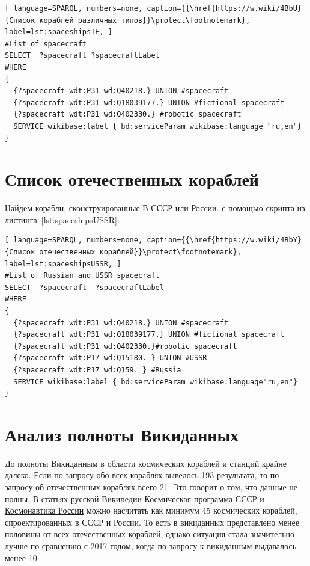 \begin{lstlisting}[ language=SPARQL, numbers=none, caption={{\href{https://w.wiki/4BbU}{Список кораблей различных типов}}\protect\footnotemark}, label=lst:spaceshipsIE, ]
#List of spacecraft 
SELECT  ?spacecraft ?spacecraftLabel   
WHERE
{
  {?spacecraft wdt:P31 wd:Q40218.} UNION #spacecraft
  {?spacecraft wdt:P31 wd:Q18039177.} UNION #fictional spacecraft
  {?spacecraft wdt:P31 wd:Q402330.} #robotic spacecraft
  SERVICE wikibase:label { bd:serviceParam wikibase:language "ru,en"}
}
\end{lstlisting}

\section{Список отечественных кораблей}
Найдем корабли, сконструированные В СССР или России. с помощью скрипта из листинга~\ref{lst:spaceshipsUSSR}:

\begin{lstlisting}[ language=SPARQL, numbers=none, caption={{\href{https://w.wiki/4BbY}{Список отечественных кораблей}}\protect\footnotemark}, label=lst:spaceshipsUSSR, ]
#List of Russian and USSR spacecraft
SELECT  ?spacecraft  ?spacecraftLabel 
WHERE
{
  {?spacecraft wdt:P31 wd:Q40218.} UNION #spacecraft
  {?spacecraft wdt:P31 wd:Q18039177.} UNION #fictional spacecraft
  {?spacecraft wdt:P31 wd:Q402330.}#robotic spacecraft
  {?spacecraft wdt:P17 wd:Q15180. } UNION #USSR
  {?spacecraft wdt:P17 wd:Q159. } #Russia
  SERVICE wikibase:label { bd:serviceParam wikibase:language"ru,en"}
}
\end{lstlisting}

\section{Анализ полноты Викиданных}
До полноты Викиданным в области космических кораблей и станций крайне далеко. Если по запросу обо всех кораблях вывелось 193 результата, то по запросу об отечественных кораблях всего 21. Это говорит о том, что данные не полны. В статьях русской Википедии \href{https://ru.wikipedia.org/wiki/%D0%9A%D0%BE%D1%81%D0%BC%D0%B8%D1%87%D0%B5%D1%81%D0%BA%D0%B0%D1%8F_%D0%BF%D1%80%D0%BE%D0%B3%D1%80%D0%B0%D0%BC%D0%BC%D0%B0_%D0%A1%D0%A1%D0%A1%D0%A0}{Космическая программа СССР} и \href{https://ru.wikipedia.org/wiki/%D0%9A%D0%BE%D1%81%D0%BC%D0%BE%D0%BD%D0%B0%D0%B2%D1%82%D0%B8%D0%BA%D0%B0_%D0%A0%D0%BE%D1%81%D1%81%D0%B8%D0%B8}{Космонавтика России} можно насчитать как минимум 45 космических кораблей, спроектированных в СССР и России. То есть в викиданных представлено менее половины от всех отечественных кораблей, однако ситуация стала значительно лучше по сравнению с 2017 годом, когда по запросу к викиданным выдавалось менее 10%

